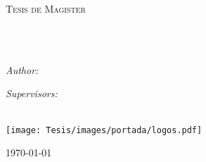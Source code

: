 \documentclass[letterpaper, english, 11pt]{MastersDoctoralThesis}  %
\author{Nombre \textsc{Apellidos}} %
\begin{document}
\frontmatter %

\pagestyle{plain} %


\begin{titlepage}
\begin{center}

\vspace*{.06\textheight}
{\scshape\LARGE \univname\par}\vspace{1.5cm} %
\textsc{\Large Tesis de Magister}\\[0.5cm] %

\HRule \\[0.4cm] %
{\huge \bfseries \ttitle\par}\vspace{0.4cm} %
\HRule \\[1.5cm] %
 
\begin{minipage}[t]{0.3\textwidth}
\begin{flushleft} \large
\emph{Author:}\\
{\authorname} %
\end{flushleft}
\end{minipage}
\begin{minipage}[t]{0.5\textwidth}
\begin{flushright} \large
\emph{Supervisors:} \\
{\supname} %
\end{flushright}
\end{minipage}\\[1.5cm]
 
\vfill
\centering
\texttt{[image: Tesis/images/portada/logos.pdf]}\\[.5cm] %
% 
%  
\vfill

{\large \today}\\[4cm] %
 
\vfill
\end{center}
\end{titlepage}
\end{document}
